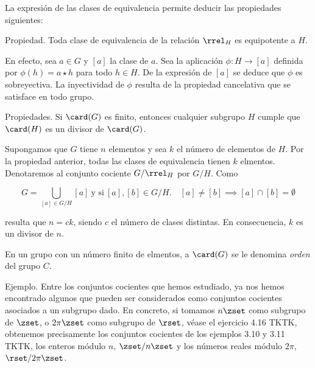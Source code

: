 La expresión de las clases de equivalencia permite deducir las propiedades
siguientes:

Propiedad. Toda clase de equivalencia de la relación $\rrel_H$ es
equipotente a $H$.

En efecto, sea $a \in G$ y $[a]$ la clase de $a$. Sea la aplicación $\phi: H
\longrightarrow [a]$ definida por $\phi(h) = a \star h$ para todo $h \in H$.
De la expresión de $[a]$ se deduce que $\phi$ es sobreyectiva. La
inyectividad de $\phi$ resulta de la propiedad cancelativa que se satisface
en todo grupo.

Propiedades. Si $\card(G)$ es finito, entonces cualquier subgrupo $H$ cumple
que $\card(H)$ es un divisor de $\card(G)$.

Supongamos que $G$ tiene $n$ elementos y sea $k$ el número de elementos de
$H$. Por la propiedad anterior, todas las clases de equivalencia tienen $k$
elmentos. Denotaremos al conjunto cociente $G/\rrel_H$ por $G/H$. Como

$$ G = \bigcup_{[a] \in G/H} [a] \ \text{y si} \ [a], [b] \in G/H.
\quad [a] \neq [b] \implies [a] \cap [b] = \emptyset $$

\noindent resulta que $n = ck$, siendo $c$ el número de clases distintas. En
consecuencia, $k$ es un divisor de $n$.

En un grupo con un número finito de elmentos, a $\card(G)$ se le denomina
\emph{orden} del grupo $C$.

Ejemplo. Entre los conjuntos cocientes que hemos estudiado, ya nos hemos
encontrado algunos que pueden ser considerados como conjuntos cocientes
asociados a un subgrupo dado. En concreto, si tomamos $n\zset$ como subgrupo
de $\zset$, o $2\pi\zset$ como subgrupo de $\rset$, véase el ejercicio 4.16
TKTK, obtenemos precisamente los conjuntos cocientes de los ejemplos 3.10 y
3.11 TKTK, los enteros módulo $n$, $\zset/n\zset$ y los números reales
módulo $2\pi$, $\rset/2\pi\zset$.









